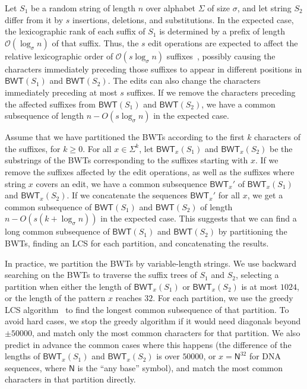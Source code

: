 \documentclass{llncs}
\newcommand{\Oh}[1]
  {\ensuremath{\mathcal{O}\!\left( {#1} \right)}}
\newcommand{\BWT}
  {\ensuremath{\mathsf{BWT}}}
\begin{document}
Let $S_{1}$ be a random string of length $n$ over alphabet $\Sigma$ of size
$\sigma$, and let string $S_{2}$ differ from it by $s$ insertions, deletions,
and substitutions. In the expected case, the lexicographic rank of each suffix of $S_1$
is determined by a prefix of length $\Oh{\log_\sigma n}$ of that suffix.
Thus, the $s$ edit operations are expected to affect the relative lexicographic order of $\Oh{s \log_\sigma n}$ suffixes~\cite{MNSV10},
possibly causing the characters immediately preceding those suffixes to appear in different positions in $\BWT (S_1)$ and $\BWT (S_2)$.
The edits can also change the characters immediately preceding at most $s$ suffixes.
If we remove the characters preceding the affected suffixes from $\BWT(S_{1})$ and $\BWT(S_{2})$, we have
a common subsequence of length $n - O(s \log_{\sigma} n)$ in the expected
case.

Assume that we have partitioned the BWTs according to the first $k$
characters of the suffixes, for $k \ge 0$. For all $x \in \Sigma^{k}$, let
$\BWT_{x}(S_{1})$ and $\BWT_{x}(S_{2})$ be the substrings of the BWTs
corresponding to the suffixes starting with $x$. If we remove the suffixes
affected by the edit operations, as well as the suffixes where string $x$
covers an edit, we have a common subsequence $\BWT_{x}'$ of $\BWT_{x}(S_{1})$
and $\BWT_{x}(S_{2})$. If we concatenate the sequences $\BWT_{x}'$ for all
$x$, we get a common subsequence of $\BWT(S_{1})$ and $\BWT(S_{2})$ of length
$n - O(s (k + \log_{\sigma} n))$ in the expected case. This suggests that we
can find a long common subsequence of $\BWT(S_{1})$ and $\BWT(S_{2})$ by
partitioning the BWTs, finding an LCS for each partition, and concatenating the
results.

In practice, we partition the BWTs by variable-length strings. We use
backward searching on the BWTs to traverse the suffix trees of $S_{1}$ and
$S_{2}$, selecting a partition when either the length of $\BWT_{x}(S_{1})$ or
$\BWT_{x}(S_{2})$ is at most $1024$, or the length of the pattern $x$ reaches
$32$. For each partition, we use the greedy LCS algorithm~\cite{Myers86} to
find the longest common subsequence of that partition. To avoid hard cases,
we stop the greedy algorithm if it would need diagonals beyond $\pm 50000$,
and match only the most common characters for that partition. We also predict
in advance the common cases where this happens (the difference of the lengths
of $\BWT_{x}(S_{1})$ and $\BWT_{x}(S_{2})$ is over $50000$, or $x =
\mathsf{N}^{32}$ for DNA sequences, where $\mathsf{N}$ is the ``any base''
symbol), and match the most common characters in that partition directly.
\end{document}
